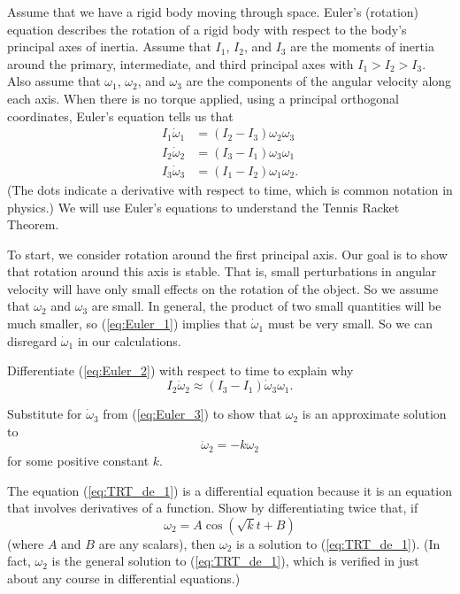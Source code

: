 Assume that we have a rigid body moving through space. Euler's (rotation) equation describes the rotation of a rigid body with respect to the body's principal axes of inertia. Assume that $I_1$, $I_2$, and $I_3$ are the moments of inertia around the primary, intermediate, and third principal axes with $I_1 > I_2 > I_3$. Also assume that $\omega_1$, $\omega_2$, and $\omega_3$ are the components of the angular velocity along each axis. When there is no torque applied, using a principal orthogonal coordinates, Euler's equation tells us that 
\begin{align}
I_1 \dot{\omega}_1 &= (I_2-I_3) \omega_2 \omega_3 \label{eq:Euler_1} \\
I_2 \dot{\omega}_2 &= (I_3-I_1) \omega_3 \omega_1 \label{eq:Euler_2}  \\
I_3 \dot{\omega}_3 &= (I_1-I_2) \omega_1 \omega_2. \label{eq:Euler_3} 
\end{align}
(The dots indicate a derivative with respect to time, which is common notation in physics.) We will use Euler's equations to understand the Tennis Racket Theorem. 
 
\begin{pactivity} \label{act:TRT_axes1} To start, we consider rotation around the first principal axis. Our goal is to show that rotation around this axis is stable. That is, small perturbations in angular velocity will have only small effects on the rotation of the object. So we assume that $\omega_2$ and $\omega_3$ are small. In general, the product of two small quantities will be much smaller, so (\ref{eq:Euler_1}) implies that $\dot{\omega}_1$ must be very small. So we can disregard $\dot{\omega}_1$ in our calculations. 
\ba
\item Differentiate (\ref{eq:Euler_2}) with respect to time to explain why 
\[I_2 \ddot{\omega}_2 \approx (I_3-I_1)  \dot{\omega}_3 \omega_1.\]
	
\item Substitute for $\dot{\omega}_3$ from (\ref{eq:Euler_3}) to show that $\omega_2$ is an approximate solution to 
\begin{equation} \label{eq:TRT_de_1}
\ddot{\omega}_2 = -k \omega_2
\end{equation}
for some positive constant $k$.

\item The equation (\ref{eq:TRT_de_1}) is a differential equation because it is an equation that involves derivatives of a function. Show by differentiating twice that, if 
\begin{equation} \label{eq:TRT:de_2}
\omega_2 = A\cos\left(\sqrt{k}t + B\right)
\end{equation} 
(where $A$ and $B$ are any scalars), then $\omega_2$ is a solution to (\ref{eq:TRT_de_1}). (In fact, $\omega_2$ is the general solution to (\ref{eq:TRT_de_1}), which is verified in just about any course in differential equations.)

\ea

\end{pactivity}


